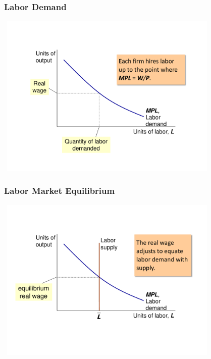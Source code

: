 \documentclass[handout]{beamer}
\begin{document}

\begin{frame}[t]
\frametitle{Labor Demand}
\begin{center}
\includegraphics[height=3.1in,width=4.25in]{../Figures/labor_demand1.pdf}
\end{center}
\end{frame}

\begin{frame}[t]
\frametitle{Labor Market Equilibrium}
\begin{center}
\includegraphics[height=3.1in,width=4.25in]{../Figures/labor_demand2.pdf}
\end{center}
\end{frame}

\end{document}

